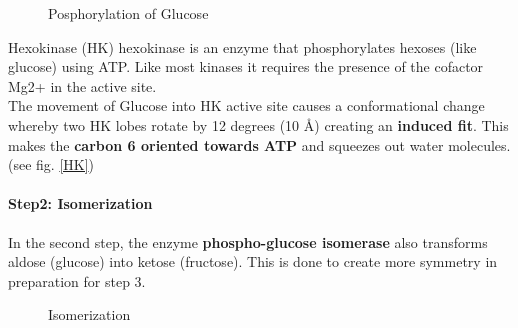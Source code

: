 \documentclass[../main.tex]{subfiles}
\begin{document}
\begin{figure}[H]
	\centering
	\caption{Posphorylation of Glucose}
\end{figure}

\begin{RemarkWithTitel}{Hexokinase (HK)}
	\gls{hexokinase} is an enzyme that phosphorylates hexoses (like glucose) using ATP. Like most kinases it requires the presence of the cofactor Mg2+ in the active site. \\
	The movement of Glucose into HK active site causes a conformational change whereby two HK lobes rotate by 12 degrees (10 \AA) creating an \textbf{induced fit}. This makes the \textbf{carbon 6 oriented towards ATP} and squeezes out water molecules. (see fig. \ref{HK}) 
\end{RemarkWithTitel}

\paragraph{Step2: Isomerization}
In the second step, the enzyme \textbf{phospho-glucose isomerase} also transforms aldose (glucose) into ketose (fructose). This is done to create more symmetry in preparation for step 3. 

\begin{figure}[H]
	\centering
	\caption{Isomerization}
\end{figure}
\end{document}

